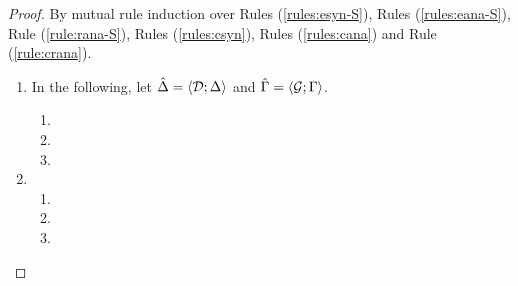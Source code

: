 \begin{proof}
By mutual rule induction over Rules (\ref{rules:esyn-S}), Rules (\ref{rules:eana-S}), Rule (\ref{rule:rana-S}), Rules (\ref{rules:csyn}), Rules (\ref{rules:cana}) and Rule (\ref{rule:crana}).

\begin{enumerate}
\item In the following, let $\hat{\Delta}=\langle \mathcal{D}; \Delta \rangle$ and $\hat{\Gamma}=\langle \mathcal{G}; \Gamma \rangle$.
  \begin{enumerate}
    \item {}
    \item {}
    \item {}
  \end{enumerate}
\item {}
  \begin{enumerate}
    \item {}
    \item {}
    \item {}
  \end{enumerate}
\end{enumerate}
\end{proof}


